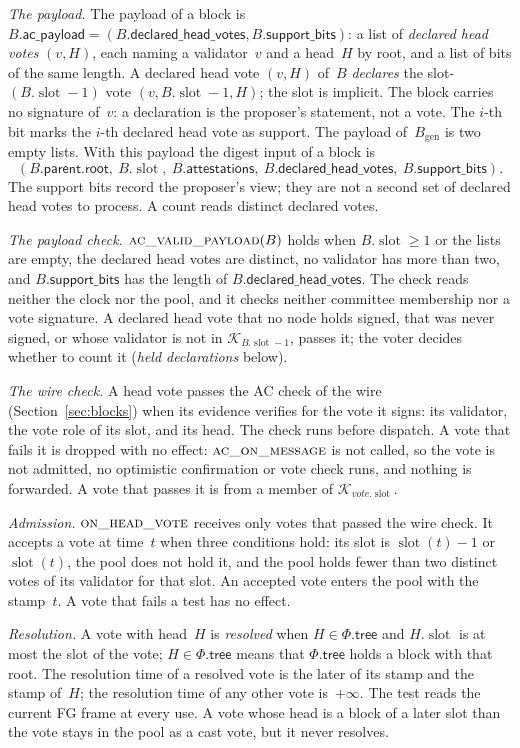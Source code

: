 \documentclass{article}
\newcommand{\genesis}{B_{\mathrm{gen}}}
\newcommand{\slot}{\operatorname{slot}}
\newcommand{\parent}{\mathsf{parent}}
\newcommand{\rootf}{\mathsf{root}}
\newcommand{\committee}{\mathcal K}
\newcommand{\acp}{\mathsf{ac\_payload}}
\newcommand{\Fr}{\Phi}
\newcommand{\tree}{\mathsf{tree}}
\begin{document}
\emph{The payload.}  The payload of a block is
$B.\acp=(B.\mathsf{declared\_head\_votes},B.\mathsf{support\_bits})$: a
list of \emph{declared head votes} $(v,H)$, each naming a validator~$v$ and a
head~$H$ by root, and a list of bits of the same length.  A declared head vote
$(v,H)$ of~$B$ \emph{declares} the slot-$(B.\slot-1)$ vote $(v,B.\slot-1,H)$; the slot is
implicit.  The block carries no signature of~$v$: a declaration is the
proposer's statement, not a vote.  The $i$-th bit marks the $i$-th
declared head vote as support.  The payload of~$\genesis$ is two empty lists.  With
this payload the digest input of a block is
\[
 (B.\parent.\rootf,\ B.\slot,\ B.\mathsf{attestations},\
 B.\mathsf{declared\_head\_votes},\ B.\mathsf{support\_bits}).
\]
The support bits record the proposer's view; they are not a second set of
declared head votes to process.  A count reads distinct declared votes.

\emph{The payload check.}  $\Call{ac\_valid\_payload}{B}$ holds when
$B.\slot\geq1$ or the lists are empty, the declared head votes are distinct,
no validator has more than two, and $B.\mathsf{support\_bits}$ has the length
of $B.\mathsf{declared\_head\_votes}$.  The check reads neither the clock
nor the pool, and it checks neither committee membership nor a vote
signature.  A declared head vote that no node holds signed, that was never
signed, or whose validator is not in $\committee_{B.\slot-1}$, passes it;
the voter decides whether to count it (\emph{held declarations} below).

\emph{The wire check.}  A head vote passes the AC check of the wire
(Section~\ref{sec:blocks}) when its evidence verifies for the vote it
signs: its validator, the vote role of its slot, and its head.  The check
runs before dispatch.  A vote that fails it is dropped with no effect:
$\Call{ac\_on\_message}{}$ is not called, so the vote is not admitted, no
optimistic confirmation or vote check runs, and nothing is forwarded.  A vote
that passes it is from a member of $\committee_{\mathit{vote}.\slot}$.

\emph{Admission.}  $\Call{on\_head\_vote}{}$ receives only votes that
passed the wire check.  It accepts a vote at time~$t$ when three conditions
hold: its slot is $\slot(t)-1$ or $\slot(t)$, the pool does not hold it, and
the pool holds fewer than two distinct votes of its validator for that
slot.  An accepted vote enters the pool with the stamp~$t$.  A vote that
fails a test has no effect.

\emph{Resolution.}  A vote with head~$H$ is \emph{resolved} when
$H\in\Fr.\tree$ and $H.\slot$ is at most the slot of the vote;
$H\in\Fr.\tree$ means that $\Fr.\tree$ holds a block with that root.  The
resolution time of a resolved vote is the later of its stamp and the stamp
of~$H$; the resolution time of any other vote is~$+\infty$.  The test reads
the current FG frame at every use.  A vote whose head is a block of a later
slot than the vote stays in the pool as a cast vote, but it never resolves.
\end{document}
